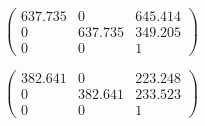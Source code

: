 


$$
\begin{pmatrix}
    637.735 & 0       & 645.414 \\     
    0       & 637.735 & 349.205 \\
    0       &       0 & 1
\end{pmatrix}
$$


$$
\begin{pmatrix}
    382.641 & 0       & 223.248 \\     
    0       & 382.641 & 233.523 \\
    0       &       0 & 1
\end{pmatrix}
$$